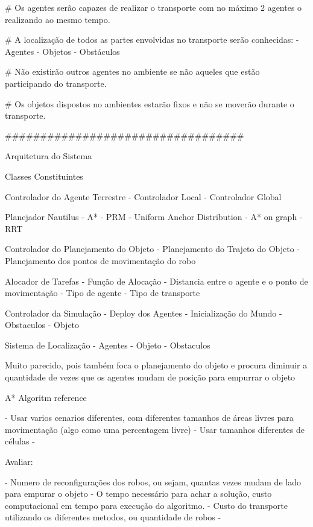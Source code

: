 # Os agentes serão capazes de realizar o transporte com no máximo 2 agentes o realizando ao mesmo tempo.

# A localização de todos as partes envolvidas no transporte serão conhecidas:
	- Agentes
	- Objetos
	- Obstáculos

# Não existirão outros agentes no ambiente se não aqueles que estão participando do transporte.

# Os objetos dispostos no ambientes estarão fixos e não se moverão durante o transporte.

##################################

Arquitetura do Sistema

Classes Constituintes

Controlador do Agente Terrestre
	- Controlador Local
	- Controlador Global

Planejador Nautilus
	- A*
	- PRM
		- Uniform Anchor Distribution
		- A* on graph
	- RRT

Controlador do Planejamento do Objeto
	- Planejamento do Trajeto do Objeto
	- Planejamento dos pontos de movimentação do robo

Alocador de Tarefas
	- Função de Alocação
		- Distancia entre o agente e o ponto de movimentação
		- Tipo de agente
		- Tipo de transporte

Controlador da Simulação
	- Deploy dos Agentes
	- Inicialização do Mundo
		- Obstaculos
		- Objeto

Sistema de Localização
	- Agentes
	- Objeto
	- Obstaculos




\cite{Parra-Gonzalez2011}

Muito parecido, pois também foca o planejamento do objeto e procura diminuir a quantidade de vezes que os agentes mudam de posição para empurrar o objeto


\cite{Hart1968} A* Algoritm reference



- Usar varios cenarios diferentes, com diferentes tamanhos de áreas livres para movimentação (algo como uma percentagem livre)
- Usar tamanhos diferentes de células
-

Avaliar:

- Numero de reconfigurações dos robos, ou sejam, quantas vezes mudam de lado para empurar o objeto
- O tempo necessário para achar a solução, custo computacional em tempo para execução do algoritmo.
- Custo do transporte utilizando os diferentes metodos, ou quantidade de robos
-
